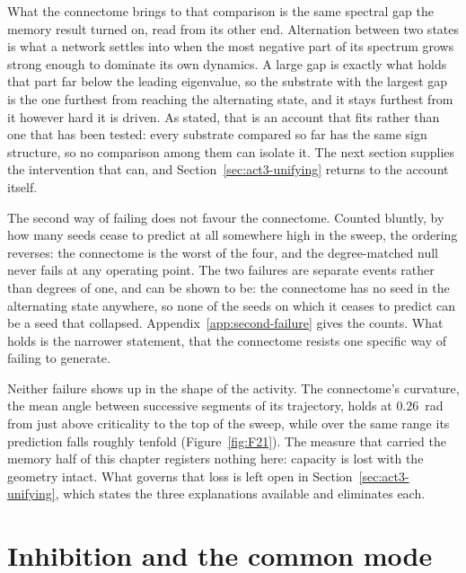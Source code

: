 What the connectome brings to that comparison is the same spectral gap the memory
result turned on, read from its other end. Alternation between two states is what
a network settles into when the most negative part of its spectrum grows strong
enough to dominate its own dynamics. A large gap is exactly what holds that part
far below the leading eigenvalue, so the substrate with the largest gap is the
one furthest from reaching the alternating state, and it stays furthest from it
however hard it is driven. As stated, that is an account that fits rather than
one that has been tested: every substrate compared so far has the same sign
structure, so no comparison among them can isolate it. The next section supplies
the intervention that can, and Section~\ref{sec:act3-unifying} returns to the
account itself.

The second way of failing does not favour the connectome. Counted bluntly, by how
many seeds cease to predict at all somewhere high in the sweep, the ordering
reverses: the connectome is the worst of the four, and the degree-matched null
never fails at any operating point. The two failures are separate events rather
than degrees of one, and can be shown to be: the connectome has no seed in the
alternating state anywhere, so none of the seeds on which it ceases to predict
can be a seed that collapsed. Appendix~\ref{app:second-failure} gives the
counts. What holds is the narrower statement, that the connectome resists one
specific way of failing to generate.

Neither failure shows up in the shape of the activity. The connectome's
curvature, the mean angle between successive segments of its trajectory, holds at
$0.26$~rad %
from just above criticality to the top of the sweep, while over the same range
its prediction falls roughly tenfold (Figure~\ref{fig:F21}). The measure that
carried the memory half of this chapter registers nothing here: capacity is lost
with the geometry intact. What governs that loss is left open in
Section~\ref{sec:act3-unifying}, which states the three explanations available
and eliminates each.






\section{Inhibition and the common mode}
\label{sec:act3-lesion}
\bigskip


